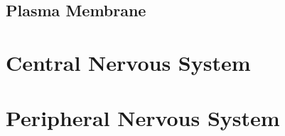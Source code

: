 \documentclass[11pt]{article}
\begin{document}
\subsection{Plasma Membrane}


\section{Central Nervous System}
\section{Peripheral Nervous System}
\end{document}
